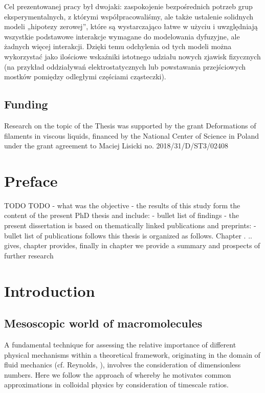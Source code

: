 \documentclass{doctoral}
\begin{document}
{    Cel prezentowanej pracy był dwojaki: zaspokojenie bezpośrednich potrzeb grup eksperymentalnych, z którymi współpracowaliśmy, ale także ustalenie solidnych modeli „hipotezy zerowej”, które są wystarczająco łatwe w użyciu i uwzględniają wszystkie podstawowe interakcje wymagane do modelowania dyfuzyjne, ale żadnych więcej interakcji.
    Dzięki temu odchylenia od tych modeli można wykorzystać jako ilościowe wskaźniki istotnego udziału nowych zjawisk fizycznych (na przykład oddziaływań elektrostatycznych lub powstawania przejściowych mostków pomiędzy odległymi częściami cząsteczki).
}
\clearpage

\section*{Funding}
Research on the topic of the Thesis was supported by the grant Deformations of filaments in viscous liquids, financed by the National Center of Science in Poland under the grant agreement to Maciej Lisicki no.
2018/31/D/ST3/02408
\clearpage

\tableofcontents

\chapter*{Preface}

TODO TODO - what was the objective - the results of this study form the content of the present PhD thesis and include: - bullet list of findings - the present dissertation is based on thematically linked publications and preprints: - bullet list of publications follows this thesis is organized as follows.
Chapter .
.. gives, chapter provides, finally in chapter we provide a summary and prospects of further research

\chapter{Introduction}

\section{Mesoscopic world of macromolecules}

A fundamental technique for assessing the relative importance of different physical mechanisms within a theoretical framework, originating in the domain of fluid mechanics (cf.
Reynolds, \cite{Reynolds_1883}), involves the consideration of dimensionless numbers.
Here we follow the approach of \cite{Nagele_2013} whereby he motivates common approximations in colloidal physics by consideration of timescale ratios.
\end{document}

